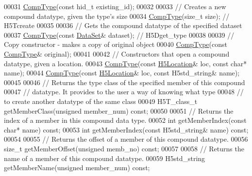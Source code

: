 \begin{DoxyCode}
00031         \hyperlink{class_h5_1_1_comp_type}{CompType}(\textcolor{keyword}{const} hid\_t existing\_id);
00032 
00033         \textcolor{comment}{// Creates a new compound datatype, given the type's size}
00034         \hyperlink{class_h5_1_1_comp_type}{CompType}(\textcolor{keywordtype}{size\_t} size); \textcolor{comment}{// H5Tcreate}
00035 
00036         \textcolor{comment}{// Gets the compound datatype of the specified dataset}
00037         \hyperlink{class_h5_1_1_comp_type}{CompType}(\textcolor{keyword}{const} \hyperlink{class_h5_1_1_data_set}{DataSet}& dataset);  \textcolor{comment}{// H5Dget\_type}
00038 
00039         \textcolor{comment}{// Copy constructor - makes a copy of original object}
00040         \hyperlink{class_h5_1_1_comp_type}{CompType}(\textcolor{keyword}{const} \hyperlink{class_h5_1_1_comp_type}{CompType}& original);
00041 
00042         \textcolor{comment}{// Constructors that open a compound datatype, given a location.}
00043         \hyperlink{class_h5_1_1_comp_type}{CompType}(\textcolor{keyword}{const} \hyperlink{class_h5_1_1_h5_location}{H5Location}& loc, \textcolor{keyword}{const} \textcolor{keywordtype}{char}* name);
00044         \hyperlink{class_h5_1_1_comp_type}{CompType}(\textcolor{keyword}{const} \hyperlink{class_h5_1_1_h5_location}{H5Location}& loc, \textcolor{keyword}{const} H5std\_string& name);
00045 
00046         \textcolor{comment}{// Returns the type class of the specified member of this compound}
00047         \textcolor{comment}{// datatype.  It provides to the user a way of knowing what type}
00048         \textcolor{comment}{// to create another datatype of the same class}
00049         H5T\_class\_t getMemberClass(\textcolor{keywordtype}{unsigned} member\_num) \textcolor{keyword}{const};
00050 
00051         \textcolor{comment}{// Returns the index of a member in this compound data type.}
00052         \textcolor{keywordtype}{int} getMemberIndex(\textcolor{keyword}{const} \textcolor{keywordtype}{char}* name) \textcolor{keyword}{const};
00053         \textcolor{keywordtype}{int} getMemberIndex(\textcolor{keyword}{const} H5std\_string& name) \textcolor{keyword}{const};
00054 
00055         \textcolor{comment}{// Returns the offset of a member of this compound datatype.}
00056         \textcolor{keywordtype}{size\_t} getMemberOffset(\textcolor{keywordtype}{unsigned} memb\_no) \textcolor{keyword}{const};
00057 
00058         \textcolor{comment}{// Returns the name of a member of this compound datatype.}
00059         H5std\_string getMemberName(\textcolor{keywordtype}{unsigned} member\_num) \textcolor{keyword}{const};

\end{DoxyCode}
